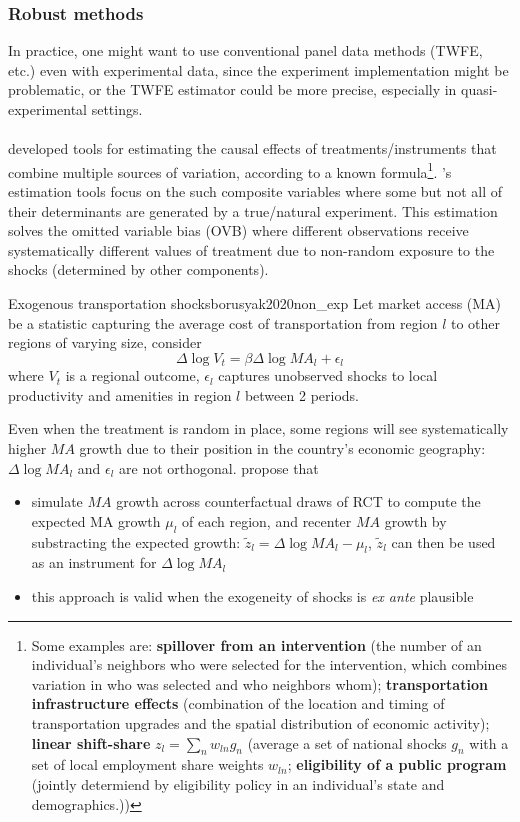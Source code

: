\documentclass[twoside]{article}
\begin{document}
\subsubsection{Robust methods}
In practice, one might want to use conventional panel data methods (TWFE, etc.) even with experimental data, since the experiment implementation might be problematic, or the TWFE estimator could be more precise, especially in quasi-experimental settings.

\paragraph*{\citet{borusyak2020non}} developed tools for estimating the causal effects of treatments/instruments that combine multiple sources of variation, according to a known formula\footnote{
    Some examples are: \textbf{spillover from an intervention} (the number of an individual's neighbors who were selected for the intervention, which combines variation in who was selected and who neighbors whom); 
    \textbf{transportation infrastructure effects} (combination of the location and timing of transportation upgrades and the spatial distribution of economic activity);
    \textbf{linear shift-share} $z_l=\sum_nw_{ln}g_n$ (average a set of national shocks $g_n$ with a set of local employment share weights $w_{ln}$;
    \textbf{eligibility of a public program} (jointly determiend by eligibility policy in an individual's state and demographics.))
}. \citet{borusyak2020non}'s estimation tools focus on the such composite variables where some but not all of their determinants are generated by a true/natural experiment. 
This estimation solves the omitted variable bias (OVB) where different observations receive systematically different values of treatment due to non-random exposure to the shocks (determined by other components).

\begin{example}{Exogenous transportation shocks}{borusyak2020non_exp}
    Let market access (MA) be a statistic capturing the average cost of transportation from region $l$ to other regions of varying size, consider $$ \Delta \log V_t = \beta \Delta \log MA_l + \epsilon_l $$
    where $V_t$ is a regional outcome, $\epsilon_l$ captures unobserved shocks to local productivity and amenities in region $l$ between 2 periods.
\end{example}
Even when the treatment is random in place, some regions will see systematically higher $MA$ growth due to their position in the country's economic geography: $\Delta\log MA_l$ and $\epsilon_l$ are not orthogonal.
\citet{borusyak2020non} propose that 
\begin{itemize}
    \item simulate $MA$ growth across counterfactual draws of RCT to compute the expected MA growth $\mu_l$ of each region, and recenter $MA$ growth by substracting the expected growth: $\tilde{z}_l = \Delta \log MA_l - \mu_l$, $\tilde{z}_l$ can then be used as an instrument for $\Delta \log MA_l$
    \item this approach is valid when the exogeneity of shocks is \textit{ex ante} plausible
\end{itemize}
\end{document}
